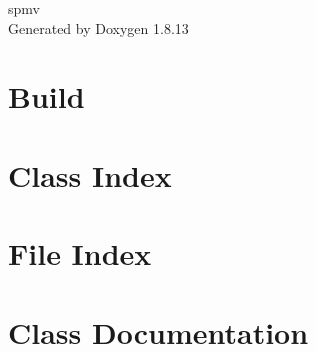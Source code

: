 \documentclass[twoside]{book}
\newcommand{\+}{\discretionary{\mbox{\scriptsize$\hookleftarrow$}}{}{}}
\newcommand{\clearemptydoublepage}{%
  \newpage{\pagestyle{empty}\cleardoublepage}%
}
\begin{document}
\hypersetup{pageanchor=false,
             bookmarksnumbered=true,
             pdfencoding=unicode
            }
\begin{titlepage}
\vspace*{7cm}
\begin{center}%
{\Large spmv }\\
\vspace*{1cm}
{\large Generated by Doxygen 1.8.13}\\
\end{center}
\end{titlepage}
\clearemptydoublepage
{}
\tableofcontents
\clearemptydoublepage
{}
\hypersetup{pageanchor=true}

\chapter{Build}
\label{md__home_tau_public_html_lecture_parallel_distributed_2018_parallel-distributed-handson_03spmv_README}

\chapter{Class Index}

\chapter{File Index}

\chapter{Class Documentation}















\end{document}
